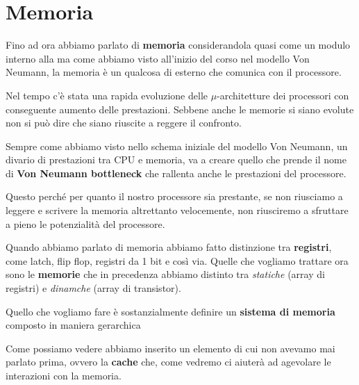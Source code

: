 \chapter{Memoria}
Fino ad ora abbiamo parlato di \textbf{memoria} considerandola quasi come un modulo interno alla
ma come abbiamo visto all'inizio del corso nel modello Von Neumann, la memoria è un qualcosa di
esterno che comunica con il processore.

Nel tempo c'è stata una rapida evoluzione delle $\mu$-architetture dei processori con conseguente
aumento delle prestazioni. Sebbene anche le memorie si siano evolute non si può dire che siano
riuscite a reggere il confronto.

Sempre come abbiamo visto nello schema iniziale del modello Von Neumann, un divario di prestazioni
tra CPU e memoria, va a creare quello che prende il nome di \textbf{Von Neumann bottleneck} che
rallenta anche le prestazioni del processore.

Questo perché per quanto il nostro processore sia prestante, se non riusciamo a leggere e scrivere
la memoria altrettanto velocemente, non riusciremo a sfruttare a pieno le potenzialità del
processore.

Quando abbiamo parlato di memoria abbiamo fatto distinzione tra \textbf{registri}, come latch, flip
flop, registri da 1 bit e così via. Quelle che vogliamo trattare ora sono le \textbf{memorie} che
in precedenza abbiamo distinto tra \emph{statiche} (array di registri) e \emph{dinamche} (array di
transistor).

Quello che vogliamo fare è sostanzialmente definire un \textbf{sistema di memoria} composto in
maniera gerarchica
\begin{center}
	
\end{center}
Come possiamo vedere abbiamo inserito un elemento di cui non avevamo mai parlato prima, ovvero la
\textbf{cache} che, come vedremo ci aiuterà ad agevolare le interazioni con la memoria.


